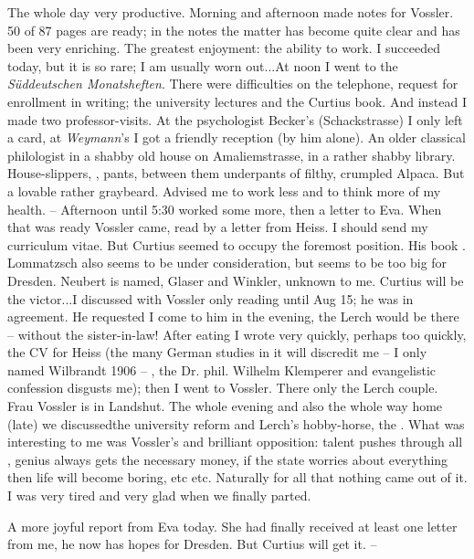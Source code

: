 
The whole day very productive. Morning and afternoon made notes for Vossler. 50 of 87 pages are ready; in the notes the matter has become quite clear and has been very enriching. The greatest enjoyment: the ability to work. I succeeded today, but it is so rare; I am usually worn out...At noon I went to the \textit{Süddeutschen Monatsheften}. There were difficulties on the telephone, request for enrollment in writing;  the university lectures and the Curtius book. And instead I made two professor-visits. At the psychologist Becker's (Schackstrasse) I only left a card, at \textit{Weymann}'s I got a friendly reception (by him alone). An older classical philologist in a shabby old house on Amaliemstrasse, in a rather shabby library. House-slippers, ,  pants, between them underpants of filthy, crumpled Alpaca. But a lovable rather  graybeard. Advised me to work less and to think more of my health. --
Afternoon until 5:30 worked some more, then a letter to Eva. When that was ready Vossler came, read by a letter from Heiss. I should send my curriculum vitae. But Curtius seemed to occupy the foremost position. His book . Lommatzsch also seems to be under consideration, but seems to be too big for Dresden. Neubert is named, Glaser and Winkler, unknown to me. Curtius will be the victor...I discussed with Vossler only reading until Aug 15; he was in agreement. He requested I come to him in the evening, the Lerch would be there -- without the sister-in-law! After eating I wrote very quickly, perhaps too quickly, the CV for Heiss (the many German studies in it will discredit me -- I only named Wilbrandt 1906 -- , the Dr. phil. Wilhelm Klemperer and evangelistic confession disgusts me); then I went to Vossler. There only the Lerch couple. Frau Vossler is in Landshut. The whole evening and also the whole way home (late) we discussedthe university reform and Lerch's hobby-horse, the . What was interesting to me was Vossler's  and brilliant opposition: talent pushes through all , genius always gets the necessary money, if the state worries about everything then life will become boring, etc etc. Naturally for all that nothing came out of it. I was very tired and very glad when we finally parted.

A more joyful report from Eva today. She had finally received at least one letter from me, he now has hopes for Dresden. But Curtius will get it. --

\missing


%